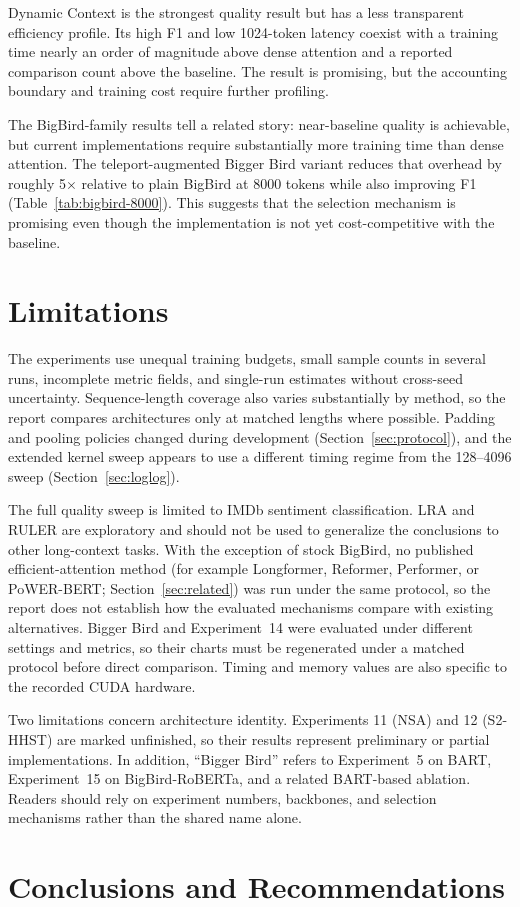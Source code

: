 \documentclass[11pt]{article}
\begin{document}
Dynamic Context is the strongest quality result but has a less transparent
efficiency profile. Its high F1 and low 1024-token latency coexist with a
training time nearly an order of magnitude above dense attention and a
reported comparison count above the baseline. The result is promising, but
the accounting boundary and training cost require further profiling.

The BigBird-family results tell a related story: near-baseline quality is
achievable, but current implementations require substantially more training
time than dense attention. The teleport-augmented Bigger Bird variant reduces
that overhead by roughly 5$\times$ relative to plain BigBird at 8000 tokens
while also improving F1 (Table~\ref{tab:bigbird-8000}). This suggests that the
selection mechanism is promising even though the implementation is not yet
cost-competitive with the baseline.

\section{Limitations}
\label{sec:limitations}

The experiments use unequal training budgets, small sample counts in several
runs, incomplete metric fields, and single-run estimates without cross-seed
uncertainty. Sequence-length coverage also varies substantially by method, so
the report compares architectures only at matched lengths where possible.
Padding and pooling policies changed during development
(Section~\ref{sec:protocol}), and the extended kernel sweep appears to use a
different timing regime from the 128--4096 sweep
(Section~\ref{sec:loglog}).

The full quality sweep is limited to IMDb sentiment classification. LRA and
RULER are exploratory and should not be used to generalize the conclusions to
other long-context tasks. With the exception of stock BigBird, no published
efficient-attention method (for example Longformer, Reformer, Performer, or
PoWER-BERT; Section~\ref{sec:related}) was run under the same protocol, so the
report does not establish how the evaluated mechanisms compare with existing
alternatives. Bigger Bird and Experiment~14 were evaluated under
different settings and metrics, so their charts must be regenerated under a
matched protocol before direct comparison. Timing and memory values are also
specific to the recorded CUDA hardware.

Two limitations concern architecture identity. Experiments 11 (NSA) and 12
(S2-HHST) are marked unfinished, so their results represent preliminary or
partial implementations. In addition, ``Bigger Bird'' refers to Experiment~5
on BART, Experiment~15 on BigBird-RoBERTa, and a related BART-based ablation.
Readers should rely on experiment numbers, backbones, and selection mechanisms
rather than the shared name alone.

\section{Conclusions and Recommendations}


\clearpage
{}



\clearpage
\appendix

\end{document}
